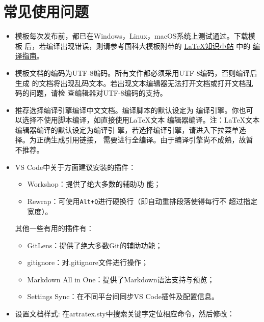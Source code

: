 
\section{常见使用问题}\label{sec:qa}

\begin{itemize}
    \item 模板每次发布前，都已在Windows，Linux，macOS系统上测试通过。下载模板
    后，若编译出现错误，则请参考国科大模板附带的
    \href{https://github.com/mohuangrui/ucasthesis/wiki}{\LaTeX{}知识小站} 中的
    \href{https://github.com/mohuangrui/ucasthesis/wiki/%E7%BC%96%E8%AF%91%E6%8C%87%E5%8D%97}{编
    译指南}。
    \item 模板文档的编码为UTF-8编码。所有文件都必须采用UTF-8编码，否则编译后生成
    的文档将出现乱码文本。若出现文本编辑器无法打开文档或打开文档乱码的问题，请检
    查编辑器对UTF-8编码的支持。
    \item 推荐选择编译引擎编译中文文档。编译脚本的默认设定为
    编译引擎。你也可以选择不使用脚本编译，如直接使用\LaTeX{}文本
    编辑器编译。注：\LaTeX{}文本编辑器编译的默认设定为编译引
    擎，若选择编译引擎，请进入下拉菜单选择。为正确生成引用链接，
    需要进行全编译。由于编译引擎尚不成熟，故暂不推荐。
    \item VS Code中关于方面建议安装的插件：
        \begin{itemize}
            \item {} Workshop：提供了绝大多数的辅助功
            能；
            \item Rewrap：可使用\verb|Alt+Q|进行硬换行（即自动重排段落使得每行不
            超过指定宽度）。
        \end{itemize}
        其他一些有用的插件有：
        \begin{itemize}
            \item GitLens：提供了绝大多数Git的辅助功能；
            \item gitignore：对.gitignore文件进行操作；
            \item Markdown All in One：提供了Markdown语法支持与预览；
            \item Settings Sync：在不同平台间同步VS Code插件及配置信息。
        \end{itemize}
    \item 设置文档样式: 在artratex.sty中搜索关键字定位相应命令，然后修改：
        \begin{itemize}

\end{itemize}
\end{itemize}
